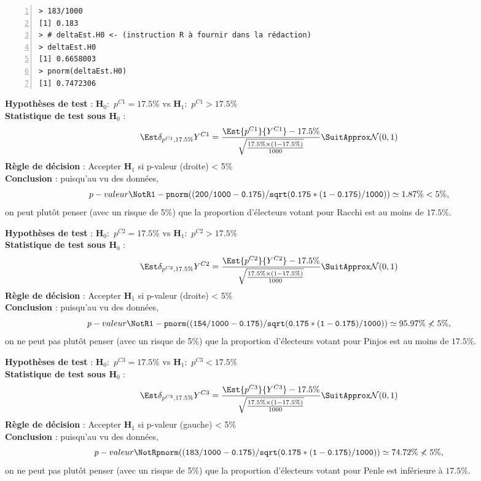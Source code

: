 \documentclass[10pt]{report}
\begin{document}
\begin{exercice}
\begin{enumerate}
\begin{Verbatim}[frame=leftline,fontfamily=tt,fontshape=n,numbers=left]
> 183/1000
[1] 0.183
> # deltaEst.H0 <- (instruction R à fournir dans la rédaction)
> deltaEst.H0
[1] 0.6658003
> pnorm(deltaEst.H0)
[1] 0.7472306
\end{Verbatim}



\begin{Correction}

\noindent \textbf{Hypothèses de test} : $\mathbf{H}_0:$ $p^{C1}=17.5\%$ vs {\large $\mathbf{H}_1:$ $p^{C1}>17.5\%$}\\
\textbf{Statistique de test sous $\mathbf{H}_0$} :
  $$
  \Est{\delta_{p^{C1},17.5\%}}{Y^{C1}}= {\displaystyle \frac{\Est{p^{C1}}{Y^{C1}}-17.5\%}{
\sqrt{\frac{17.5\%\times (1-17.5\%)} {1000}}
}} 
  \SuitApprox \mathcal{N}(0,1)
  $$
\textbf{Règle de décision} : Accepter $\mathbf{H}_1$ si 
  p-valeur (droite) < 5\%\\
\noindent \textbf{Conclusion} :
puisqu'au vu des données, 
  \[
p-valeur\NotR\mathtt{1-pnorm((200/1000-0.175)/sqrt(0.175*(1-0.175)/1000))} \simeq 1.87\% < 5\%,
\]
on peut plutôt penser (avec un risque de 5\%) que la proportion d'électeurs votant pour Racchi est au moins de $17.5\%$.

\noindent \textbf{Hypothèses de test} : $\mathbf{H}_0:$ $p^{C2}=17.5\%$ vs {\large $\mathbf{H}_1:$ $p^{C2}>17.5\%$}\\
\textbf{Statistique de test sous $\mathbf{H}_0$} :
  $$
  \Est{\delta_{p^{C2},17.5\%}}{Y^{C2}}= {\displaystyle \frac{\Est{p^{C2}}{Y^{C2}}-17.5\%}{
\sqrt{\frac{17.5\%\times (1-17.5\%)} {1000}}
}} 
  \SuitApprox \mathcal{N}(0,1)
  $$
\textbf{Règle de décision} : Accepter $\mathbf{H}_1$ si 
  p-valeur (droite) < 5\%\\
\noindent \textbf{Conclusion} :
puisqu'au vu des données, 
  \[
p-valeur\NotR\mathtt{1-pnorm((154/1000-0.175)/sqrt(0.175*(1-0.175)/1000))} \simeq 95.97\%\nless5\%,
\]
on ne peut pas plutôt penser (avec un risque de 5\%) que la proportion d'électeurs votant pour Pinjos est au moins de $17.5\%$.

\noindent \textbf{Hypothèses de test} : $\mathbf{H}_0:$ $p^{C3}=17.5\%$ vs {\large $\mathbf{H}_1:$ $p^{C3}<17.5\%$}\\
\textbf{Statistique de test sous $\mathbf{H}_0$} :
  $$
  \Est{\delta_{p^{C3},17.5\%}}{Y^{C3}}= {\displaystyle \frac{\Est{p^{C3}}{Y^{C3}}-17.5\%}{
\sqrt{\frac{17.5\%\times (1-17.5\%)} {1000}}
}} 
  \SuitApprox \mathcal{N}(0,1)
  $$
\textbf{Règle de décision} : Accepter $\mathbf{H}_1$ si 
  p-valeur (gauche) < 5\%\\
\noindent \textbf{Conclusion} :
puisqu'au vu des données, 
  \[
p-valeur\NotR\mathtt{pnorm((183/1000-0.175)/sqrt(0.175*(1-0.175)/1000))} \simeq 74.72\%\nless5\%,
\]
on ne peut pas plutôt penser (avec un risque de 5\%) que la proportion d'électeurs votant pour Penle est inférieure à $17.5\%$.
\end{Correction}



\end{enumerate}
\end{exercice}
\end{document}
